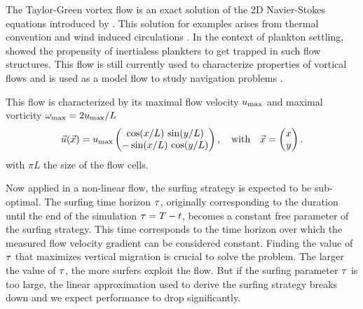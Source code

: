 The Taylor-Green vortex flow is an exact solution of the 2D Navier-Stokes equations introduced by \citet{taylor1937mechanism}.
This solution for examples arises from thermal convention and wind induced \citet{langmuir1938surface} circulations \citep{woodcock1941surface}.
In the context of plankton settling, \citet{stommel1949trajectories} showed the propensity of inertialess plankters to get trapped in such flow structures.
This flow is still currently used to characterize properties of vortical flows \citep{samant2021dynamic} and is used as a model flow to study navigation problems \citep{colabrese2017flow, qiu2022navigation}.

This flow is characterized by its maximal flow velocity $u_{\mathrm{max}}$ and maximal vorticity $\omega_{\mathrm{max}} = 2 u_{\mathrm{max}} / L$
\begin{equation}\label{eq:taylor_green_vortex_velocity}
	\vec{u}(\vec{x}) = u_{\mathrm{max}}
	\begin{pmatrix}
		\cos (x/L) \, \sin (y/L) \\
		-\sin (x/L) \, \cos (y/L)
	\end{pmatrix},
	\quad \text{with} \quad
	\vec{x} =
	\begin{pmatrix}
		x \\
		y
	\end{pmatrix}.
\end{equation}
with $\pi L$ the size of the flow cells.

Now applied in a non-linear flow, the surfing strategy is expected to be sub-optimal. 
The surfing time horizon $\tau$, originally corresponding to the duration until the end of the simulation $\tau = T - t$, becomes a constant free parameter of the surfing strategy.
This time corresponds to the time horizon over which the measured flow velocity gradient can be considered constant.
Finding the value of $\tau$ that maximizes vertical migration is crucial to solve the problem.
The larger the value of $\tau$, the more surfers exploit the flow. 
But if the surfing parameter $\tau$ is too large, the linear approximation used to derive the surfing strategy breaks down and we expect performance to drop significantly.


